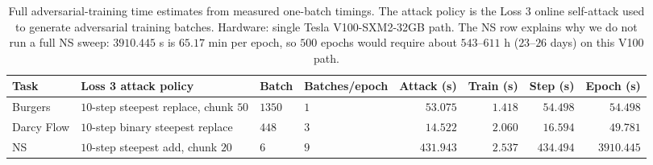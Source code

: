 \documentclass[letterpaper]{article} %
\begin{document}
\begin{table}[t]
\centering
\footnotesize
\caption{Full adversarial-training time estimates from measured
one-batch timings. The attack policy is the Loss 3 online self-attack used to
generate adversarial training batches. Hardware: single Tesla V100-SXM2-32GB path.
The NS row explains why we do not run a full NS sweep: $3910.445$ s is
$65.17$ min per epoch, so $500$ epochs would require about $543$--$611$ h
($23$--$26$ days) on this V100 path.}
\label{tab:adv_training_epoch_timing}
\setlength{\tabcolsep}{2.4pt}
\begin{tabular}{llllrrrr}
\toprule
Task & Loss 3 attack policy & Batch & Batches/epoch & Attack (s) & Train (s) & Step (s) & Epoch (s) \\
\midrule
Burgers & $10$-step steepest replace, chunk $50$ & $1350$ & $1$ & $53.075$ & $1.418$ & $54.498$ & $54.498$ \\
Darcy Flow & $10$-step binary steepest replace & $448$ & $3$ & $14.522$ & $2.060$ & $16.594$ & $49.781$ \\
NS & $10$-step steepest add, chunk $20$ & $6$ & $9$ & $431.943$ & $2.537$ & $434.494$ & $3910.445$ \\
\bottomrule
\end{tabular}
\end{table}

\clearpage
{}
\end{document}
